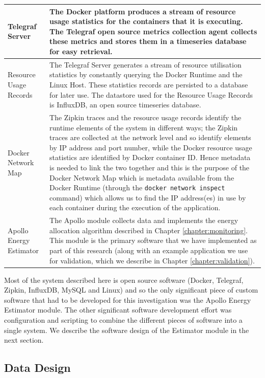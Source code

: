 \begin{table}
\begin{tabular}{|l|p{10cm}|}
\hline
Telegraf Server & The Docker platform produces a stream of resource usage statistics for the containers that it is executing.  The Telegraf open source metrics collection agent collects these metrics and stores them in a timeseries database for easy retrieval. \\
\hline
Resource Usage Records & The Telegraf Server generates a stream of resource utilisation statistics by constantly querying the Docker Runtime and the Linux Host.  These statistics records are persisted to a database for later use.  The datastore used for the Resource Usage Records is InfluxDB, an open source timeseries database. \\
\hline
Docker Network Map & The Zipkin traces and the resource usage records identify the runtime elements of the system in different ways; the Zipkin traces are collected at the network level and so identify elements by IP address and port number, while the Docker resource usage statistics are identified by Docker container ID.  Hence metadata is needed to link the two together and this is the purpose of the Docker Network Map which is metadata available from the Docker Runtime (through the \texttt{docker network inspect} command) which allows us to find the IP address(es) in use by each container during the execution of the application. \\
\hline
Apollo Energy Estimator & The Apollo module collects data and implements the energy allocation algorithm described in Chapter \ref{chapter:monitoring}.  This module is the primary software that we have implemented as part of this research (along with an example application we use for validation, which we describe in Chapter \ref{chapter:validation}). \\
\hline
\end{tabular}
\end{table}

Most of the system described here is open source software (Docker, Telegraf, Zipkin, InfluxDB, MySQL and Linux) and so the only significant piece of custom software that had to be developed for this investigation was the Apollo Energy Estimator module.  The other significant software development effort was configuration and scripting to combine the different pieces of software into a single system.  We describe the software design of the Estimator module in the next section.

\subsection{Data Design}
\label{subsection:data-design}

